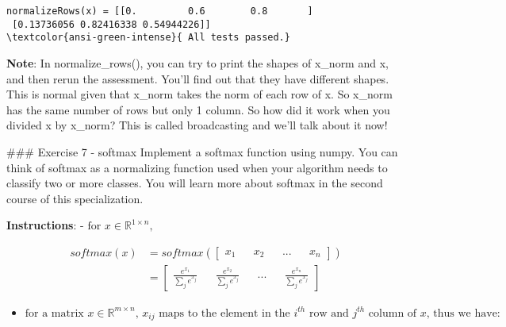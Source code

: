 \documentclass[11pt]{article}
\providecommand{\tightlist}{%
      \setlength{\itemsep}{0pt}\setlength{\parskip}{0pt}}
\begin{document}
    \begin{Verbatim}[commandchars=\\\{\}]
normalizeRows(x) = [[0.         0.6        0.8       ]
 [0.13736056 0.82416338 0.54944226]]
\textcolor{ansi-green-intense}{ All tests passed.}
    \end{Verbatim}

    \textbf{Note}: In normalize\_rows(), you can try to print the shapes of
x\_norm and x, and then rerun the assessment. You'll find out that they
have different shapes. This is normal given that x\_norm takes the norm
of each row of x. So x\_norm has the same number of rows but only 1
column. So how did it work when you divided x by x\_norm? This is called
broadcasting and we'll talk about it now!

    \#\#\# Exercise 7 - softmax Implement a softmax function using numpy.
You can think of softmax as a normalizing function used when your
algorithm needs to classify two or more classes. You will learn more
about softmax in the second course of this specialization.

\textbf{Instructions}: -
\(\text{for } x \in \mathbb{R}^{1\times n} \text{,     }\)

\begin{align*}
 softmax(x) &= softmax\left(\begin{bmatrix}
    x_1  &&
    x_2 &&
    ...  &&
    x_n  
\end{bmatrix}\right) \\&= \begin{bmatrix}
    \frac{e^{x_1}}{\sum_{j}e^{x_j}}  &&
    \frac{e^{x_2}}{\sum_{j}e^{x_j}}  &&
    ...  &&
    \frac{e^{x_n}}{\sum_{j}e^{x_j}} 
\end{bmatrix} 
\end{align*}

\begin{itemize}
\tightlist
\item
  \(\text{for a matrix } x \in \mathbb{R}^{m \times n} \text{,  $x_{ij}$ maps to the element in the $i^{th}$ row and $j^{th}$ column of $x$, thus we have: }\)
\end{itemize}
\end{document}
